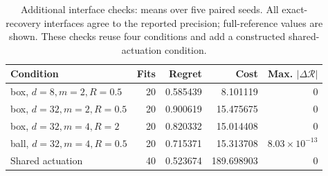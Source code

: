 \begin{table}[htbp]\centering\small
\caption{Additional interface checks: means over five paired seeds. All exact-recovery interfaces agree to the reported precision; full-reference values are shown. These checks reuse four conditions and add a constructed shared-actuation condition.}\label{tab:direct-training}
\begin{tabular}{lrrrr}\toprule
Condition & Fits & Regret & Cost & Max. $|\Delta\mathcal R|$\\\midrule
box, $d=8,m=2,R=0.5$ & 20 & 0.585439 & 8.101119 & $0$\\
box, $d=32,m=2,R=0.5$ & 20 & 0.900619 & 15.475675 & $0$\\
box, $d=32,m=4,R=2$ & 20 & 0.820332 & 15.014408 & $0$\\
ball, $d=32,m=4,R=0.5$ & 20 & 0.715371 & 15.313708 & $8.03\times10^{-13}$\\
Shared actuation & 40 & 0.523674 & 189.698903 & $0$\\
\bottomrule\end{tabular}
\end{table}
